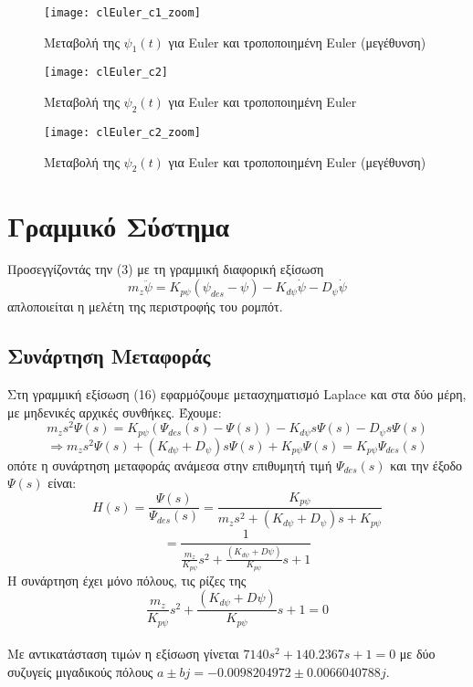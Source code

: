 \documentclass{article}
\begin{document}
\begin{figure}[h!]
 \centering
\texttt{[image: clEuler\_c1\_zoom]}
\caption{Μεταβολή της $\psi_1(t)$ για Euler και τροποποιημένη Euler (μεγέθυνση)}
\end{figure}
\clearpage

\begin{figure}[bh!]
 \centering
\texttt{[image: clEuler\_c2]}
\caption{Μεταβολή της $\psi_2(t)$ για Euler και τροποποιημένη
 Euler}
\end{figure}

\begin{figure}[h!]
 \centering
\texttt{[image: clEuler\_c2\_zoom]}
\caption{Μεταβολή της $\psi_2(t)$ για Euler και τροποποιημένη Euler (μεγέθυνση)}
\end{figure}
\clearpage

\section{Γραμμικό Σύστημα}
Προσεγγίζοντάς την (3) με τη γραμμική διαφορική εξίσωση 
\begin{equation}
m_z\ddot{\psi} = K_{p\psi}(\psi_{des} - \psi) - K_{d\psi}\dot{\psi} - D_\psi\dot{\psi}
\end{equation}
απλοποιείται η μελέτη της περιστροφής του ρομπότ.
\subsection{Συνάρτηση Μεταφοράς}
Στη γραμμική εξίσωση (16) εφαρμόζουμε μετασχηματισμό Laplace και στα δύο μέρη, με μηδενικές αρχικές συνθήκες. Έχουμε:
\[m_zs^2Ψ(s) = K_{p\psi}(Ψ_{des}(s) - Ψ(s)) - K_{d\psi}sΨ(s) - D_\psi s Ψ(s)\]
\[\Rightarrow m_zs^2Ψ(s) + (K_{d\psi} + D_\psi)sΨ(s) + K_{p\psi}Ψ(s) = K_{p\psi}Ψ_{des}(s)\]
οπότε η συνάρτηση μεταφοράς ανάμεσα στην επιθυμητή τιμή \(Ψ_{des}(s)\) και την έξοδο \(Ψ(s)\) είναι:
\[H(s) = \frac{Ψ(s)}{Ψ_{des}(s)} = \frac{K_{p\psi}}{m_zs^2 + (K_{d\psi} + D_\psi)s + K_{p\psi}}\]
\[= \frac{1}{\frac{m_z}{K_{p\psi}}s^2 + \frac{(K_{d\psi} + D\psi)}{K_{p\psi}}s +1}\]
Η συνάρτηση έχει μόνο πόλους, τις ρίζες της 
\begin{equation}
\frac{m_z}{K_{p\psi}}s^2 + \frac{(K_{d\psi} + D\psi)}{K_{p\psi}}s +1 = 0
\end{equation}
\\Με αντικατάσταση τιμών η εξίσωση γίνεται \(7140s^2 + 140.2367s + 1 = 0\) με δύο συζυγείς μιγαδικούς πόλους \(a\pm bj = -0.0098204972 \pm 0.0066040788j\).
\end{document}

